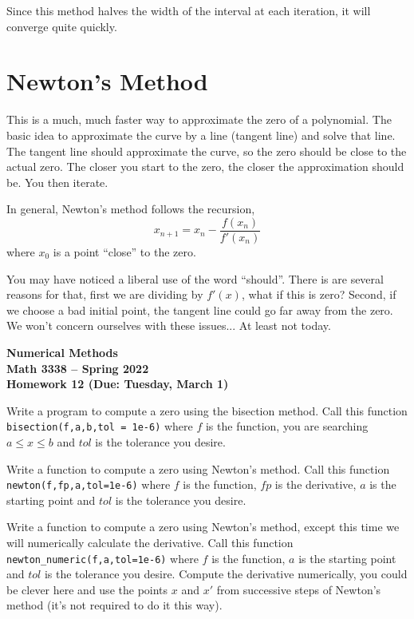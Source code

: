 \documentclass[11pt,letterpaper]{article}
\newcommand{\semester}{Spring 2022}
\newcommand{\due}{Tuesday, March 1}
\begin{document}
Since this method halves the width of the interval at each iteration, it will converge quite
quickly.

\section{Newton's Method}

This is a much, much faster way to approximate the zero of a polynomial. The basic idea to
approximate the curve by a line (tangent line) and solve that line. The tangent line should approximate
the curve, so the zero should be close to the actual zero. The closer you start to the zero, the 
closer the approximation should be. You then iterate.

In general, Newton's method follows the recursion,
\[
 x_{n+1} = x_n - \frac{f(x_n)}{f'(x_n)}
\]
where $x_0$ is a point ``close'' to the zero.

You may have noticed a liberal use of the word ``should''. There is are several reasons for that,
first we are dividing by $f'(x)$, what if this is zero? Second, if we choose a bad initial point,
the tangent line could go far away from the zero. We won't concern ourselves with these issues...
At least not today.

\newpage

\begin{center}
{\huge{\bf  Numerical Methods}} \\[1.5ex]
{\bf Math 3338 -- \semester}\\[1.5ex]
{\Large{\bf Homework 12 (Due: \due)}}\\
\end{center}
\vspace{2mm}

\begin{problem}
 Write a program to compute a zero using the bisection method. Call this function
\texttt{bisection(f,a,b,tol = 1e-6)} where $f$ is the function, you are searching $a\le x\le b$
and $tol$ is the tolerance you desire.
\end{problem}

\begin{problem}
 Write a function to compute a zero using Newton's method. Call this function 
\texttt{newton(f,fp,a,tol=1e-6)} where $f$ is the function, $fp$ is the derivative, $a$ is the
starting point and $tol$ is the tolerance you desire.
\end{problem}


\begin{problem}
 Write a function to compute a zero using Newton's method, except this time we will numerically 
calculate the derivative. Call this function \texttt{newton\_numeric(f,a,tol=1e-6)} where $f$ is the 
function, $a$ is the starting point and $tol$ is the tolerance you desire. Compute the derivative
numerically, you could be clever here and use the points $x$ and $x'$ from successive steps
of Newton's method (it's not required to do it this way).
\end{problem}
\end{document}
